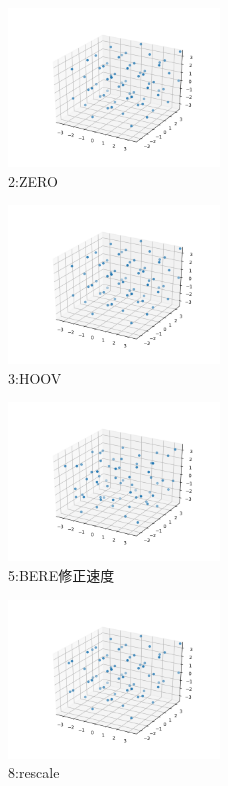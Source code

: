 \documentclass{ctexart}
\begin{document}
\begin{figure}[!htbp]
    \centering
    \includegraphics[width=0.5\textwidth]{fig/sim2.png}
    \caption{2:ZERO}
\end{figure}
\begin{figure}[!htbp]
    \centering
    \includegraphics[width=0.5\textwidth]{fig/sim3.png}
    \caption{3:HOOV}
\end{figure}
\begin{figure}[!htbp]
    \centering
    \includegraphics[width=0.5\textwidth]{fig/sim5.png}
    \caption{5:BERE修正速度}
\end{figure}
\begin{figure}[!htbp]
    \centering
    \includegraphics[width=0.5\textwidth]{fig/sim8.png}
    \caption{8:rescale}
\end{figure}
\end{document}
